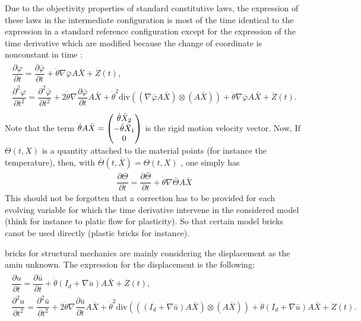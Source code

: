 \documentclass[a4paper,11pt,english]{sphinxmanual}
\begin{document}
Due to the objectivity properties of standard constitutive laws, the expression of these laws in the intermediate configuration is most of the time identical to the expression in a standard reference configuration except for the expression of the time derivative which are modified because the change of coordinate is  nonconstant in time :
\begin{align*}\!\begin{aligned}
\dfrac{\partial \varphi}{\partial t} = \dfrac{\partial \bar{\varphi}}{\partial t} + \dot{\theta} \nabla \bar{\varphi} A \bar{X} + \dot{Z}(t),\\
\dfrac{\partial^2 \varphi}{\partial t^2} = \dfrac{\partial^2 \bar{\varphi}}{\partial t^2} + 2\dot{\theta} \nabla\dfrac{\partial \bar{\varphi}}{\partial t}A \bar{X} + \dot{\theta}^2\mbox{div}((\nabla\bar{\varphi}A \bar{X}) \otimes (A \bar{X}) )  + \ddot{\theta}\nabla\bar{\varphi}A \bar{X} + \ddot{Z}(t).\\
\end{aligned}\end{align*}
Note that the term \(\dot{\theta} A \bar{X} = \left(\hspace*{-0.5em}\begin{array}{c} \dot{\theta}\bar{X}_2 \\ -\dot{\theta}\bar{X}_1 \\ 0 \end{array}\hspace*{-0.5em}\right)\) is the rigid motion velocity vector. Now, If \(\Theta(t,X)\) is a quantity attached to the material points (for instance the temperature), then, with \(\bar{\Theta}(t,\bar{X}) = \Theta(t,X)\) , one simply has
\begin{equation*}
\begin{split}\dfrac{\partial \Theta}{\partial t} = \dfrac{\partial \bar{\Theta}}{\partial t} + \dot{\theta} \nabla \bar{\Theta} A \bar{X}\end{split}
\end{equation*}
This should not be forgotten that a correction has to be provided for each evolving variable for which the time derivative intervene in the considered model (think for instance to platic flow for plasticity). So that certain model bricks canot be used directly (plastic bricks for instance).

 bricks for structural mechanics are mainly considering the displacement as the amin unknown. The expression for the displacement is the following:
\begin{align*}\!\begin{aligned}
\dfrac{\partial u}{\partial t} = \dfrac{\partial \bar{u}}{\partial t} + \dot{\theta} (I_d + \nabla \bar{u}) A \bar{X} + \dot{Z}(t),\\
\dfrac{\partial^2 u}{\partial t^2} = \dfrac{\partial^2 \bar{u}}{\partial t^2} + 2\dot{\theta} \nabla\dfrac{\partial \bar{u}}{\partial t}A \bar{X} +  \dot{\theta}^2\mbox{div}(((I_d + \nabla\bar{u})A \bar{X}) \otimes (A \bar{X}) )  + \ddot{\theta} (I_d + \nabla\bar{u}) A \bar{X}  + \ddot{Z}(t).\\
\end{aligned}\end{align*}
\end{document}
